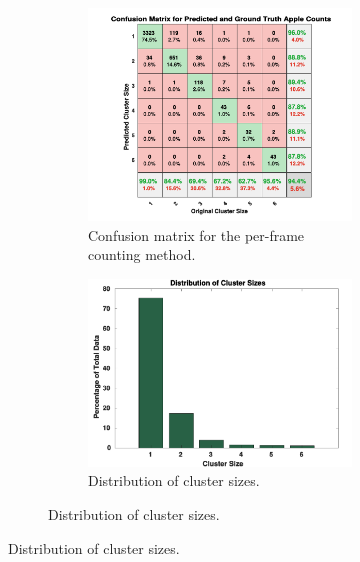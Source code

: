 \begin{figure}[!hbpt]
        \centering
        \begin{subfigure}[b]{\textwidth}\begin{subfigure}[b]{.55\textwidth}
                 \includegraphics[width=\textwidth]{figures/counting/confusionmat.pdf}
                 \caption{Confusion matrix for the per-frame counting method.}
                     \label{fig:confusionmat}   
        \end{subfigure}\quad \begin{subfigure}[b]{.40\textwidth}
                         \includegraphics[width=\textwidth]{figures/counting/ClusterDist.pdf}
                 \caption{Distribution of cluster sizes.}

\end{subfigure}
\end{subfigure}
\end{figure}
